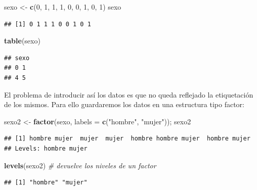 \documentclass[]{book}
\newenvironment{Shaded}{\begin{snugshade}}{\end{snugshade}}
\newcommand{\CommentTok}[1]{\textcolor[rgb]{0.56,0.35,0.01}{\textit{#1}}}
\newcommand{\DataTypeTok}[1]{\textcolor[rgb]{0.13,0.29,0.53}{#1}}
\newcommand{\DecValTok}[1]{\textcolor[rgb]{0.00,0.00,0.81}{#1}}
\newcommand{\KeywordTok}[1]{\textcolor[rgb]{0.13,0.29,0.53}{\textbf{#1}}}
\newcommand{\NormalTok}[1]{#1}
\newcommand{\StringTok}[1]{\textcolor[rgb]{0.31,0.60,0.02}{#1}}
\begin{document}
\begin{Shaded}
\begin{Highlighting}[]
\NormalTok{sexo <-}\StringTok{ }\KeywordTok{c}\NormalTok{(}\DecValTok{0}\NormalTok{, }\DecValTok{1}\NormalTok{, }\DecValTok{1}\NormalTok{, }\DecValTok{1}\NormalTok{, }\DecValTok{0}\NormalTok{, }\DecValTok{0}\NormalTok{, }\DecValTok{1}\NormalTok{, }\DecValTok{0}\NormalTok{, }\DecValTok{1}\NormalTok{)}
\NormalTok{sexo}
\end{Highlighting}
\end{Shaded}

\begin{verbatim}
## [1] 0 1 1 1 0 0 1 0 1
\end{verbatim}

\begin{Shaded}
\begin{Highlighting}[]
\KeywordTok{table}\NormalTok{(sexo)}
\end{Highlighting}
\end{Shaded}

\begin{verbatim}
## sexo
## 0 1 
## 4 5
\end{verbatim}

El problema de introducir así los datos es que no queda reflejado la
etiquetación de los mismos. Para ello guardaremos los datos en una
estructura tipo factor:

\begin{Shaded}
\begin{Highlighting}[]
\NormalTok{sexo2 <-}\StringTok{ }\KeywordTok{factor}\NormalTok{(sexo, }\DataTypeTok{labels =} \KeywordTok{c}\NormalTok{(}\StringTok{"hombre"}\NormalTok{, }\StringTok{"mujer"}\NormalTok{)); sexo2}
\end{Highlighting}
\end{Shaded}

\begin{verbatim}
## [1] hombre mujer  mujer  mujer  hombre hombre mujer  hombre mujer 
## Levels: hombre mujer
\end{verbatim}

\begin{Shaded}
\begin{Highlighting}[]
\KeywordTok{levels}\NormalTok{(sexo2)  }\CommentTok{# devuelve los niveles de un factor}
\end{Highlighting}
\end{Shaded}

\begin{verbatim}
## [1] "hombre" "mujer"
\end{verbatim}
\end{document}
